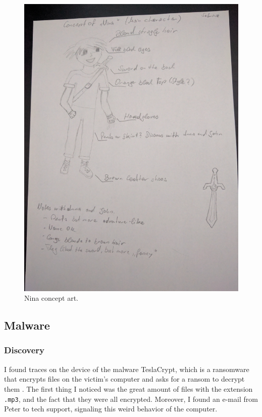 \documentclass[12pt]{article}
\begin{document}
\begin{figure}[!ht]
    \centering
    \includegraphics[width=\textwidth]{images/nina_concept.jpg}
    \caption{Nina concept art.}
    \label{fig:nina}
\end{figure}

\subsection{Malware}
\label{sec:malware}

\subsubsection{Discovery}
I found traces on the device of the malware TeslaCrypt, which is a ransomware that encrypts files on the victim's computer and asks for a ransom to decrypt them \cite{teslacrypt}.
The first thing I noticed was the great amount of files with the extension \texttt{.mp3}, and the fact that they were all encrypted.
Moreover, I found an e-mail from Peter to tech support, signaling this weird behavior of the computer.
\end{document}
